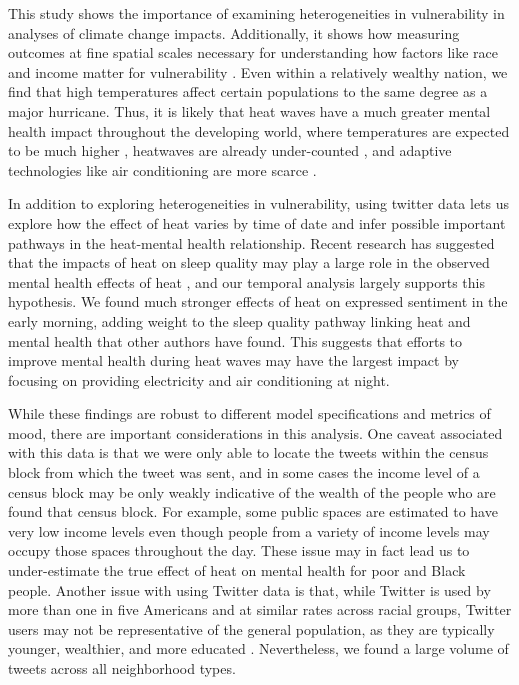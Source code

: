 \documentclass[titlepage]{article}
\begin{document}
This study shows the importance of examining heterogeneities in vulnerability in analyses of climate change impacts.  Additionally, it shows how measuring outcomes at fine spatial scales necessary for understanding how factors like race and income matter for vulnerability \citep{Tong2021}. Even within a relatively wealthy nation, we find that high temperatures affect certain populations to the same degree as a major hurricane. Thus, it is likely that heat waves have a much greater mental health impact throughout the developing world, where temperatures are expected to be much higher \citep{Raymond2020May}, heatwaves are already under-counted \citep{Harrington2020Sep}, and adaptive technologies like air conditioning are more scarce \citep{Biardeau2020Jan}.

In addition to exploring heterogeneities in vulnerability, using twitter data lets us explore how the effect of heat varies by time of date and infer possible important pathways in the heat-mental health relationship. Recent research has suggested that the impacts of heat on sleep quality may play a large role in the observed mental health effects of heat \citep{Obradovich2017May, Mullins2019Dec}, and our temporal analysis largely supports this hypothesis.  We found much stronger effects of heat on expressed sentiment in the early morning, adding weight to the sleep quality pathway linking heat and mental health that other authors have found.  This suggests that efforts to improve mental health during heat waves may have the largest impact by focusing on providing electricity and air conditioning at night.


While these findings are robust to different model specifications and metrics of mood, there are important considerations in this analysis.  One caveat associated with this data is that we were only able to locate the tweets within the census block from which the tweet was sent, and in some cases the income level of a census block may be only weakly indicative of the wealth of the people who are found that census block. For example, some public spaces are estimated to have very low income levels even though people from a variety of income levels may occupy those spaces throughout the day. These issue may in fact lead us to under-estimate the true effect of heat on mental health for poor and Black people. Another issue with using Twitter data is that, while Twitter is used by more than one in five Americans and at similar rates across racial groups, Twitter users may not be representative of the general population, as they are typically younger, wealthier, and more educated \citep{Pew2020Sep}. Nevertheless, we found a large volume of tweets across all neighborhood types.
\end{document}
